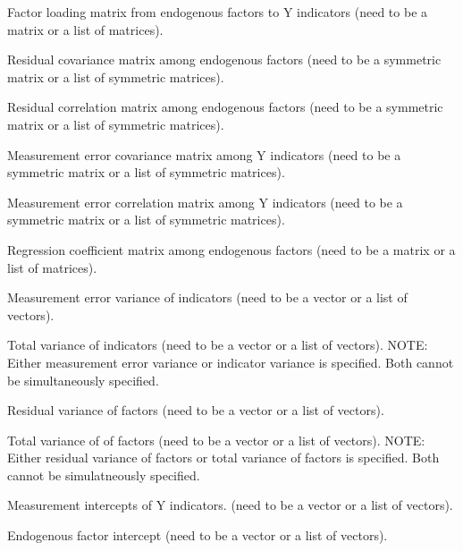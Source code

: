 \documentclass[a4paper]{book}
\begin{document}
\begin{Arguments}
\begin{ldescription}
\item[\code{LY}] 
Factor loading matrix from endogenous factors to Y indicators (need to be a matrix or a list of matrices).

\item[\code{PS}] 
Residual covariance matrix among endogenous factors (need to be a symmetric matrix or a list of symmetric matrices).

\item[\code{RPS}] 
Residual correlation matrix among endogenous factors (need to be a symmetric matrix or a list of symmetric matrices).

\item[\code{TE}] 
Measurement error covariance matrix among Y indicators (need to be a symmetric matrix or a list of symmetric matrices).

\item[\code{RTE}] 
Measurement error correlation matrix among Y indicators (need to be a symmetric matrix or a list of symmetric matrices).

\item[\code{BE}] 
Regression coefficient matrix among endogenous factors (need to be a matrix or a list of matrices).

\item[\code{VTE}] 
Measurement error variance of indicators (need to be a vector or a list of vectors).

\item[\code{VY}] 
Total variance of indicators (need to be a vector or a list of vectors). NOTE: Either measurement error variance or indicator variance is specified. Both cannot be simultaneously specified.

\item[\code{VPS}] 
Residual variance of factors (need to be a vector or a list of vectors).

\item[\code{VE}] 
Total variance of of factors (need to be a vector or a list of vectors). NOTE: Either residual variance of factors or total variance of factors is specified. Both cannot be simulatneously specified.
 
\item[\code{TY}] 
Measurement intercepts of Y indicators. (need to be a vector or a list of vectors).

\item[\code{AL}] 
Endogenous factor intercept (need to be a vector or a list of vectors).


\end{ldescription}
\end{Arguments}
\end{document}
